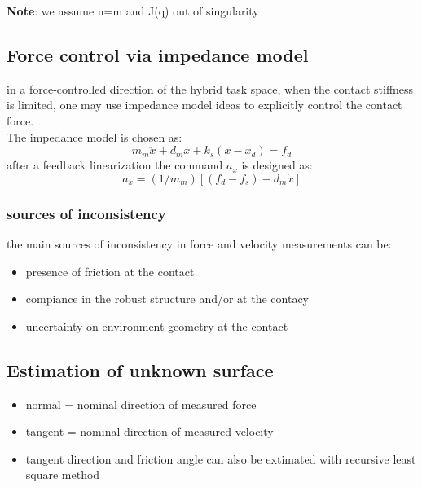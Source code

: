 \documentclass[a4paper,12pt]{article}
\begin{document}
\textbf{Note}: we assume n=m and J(q) out of singularity
\subsection{Force control via impedance model}
in a force-controlled direction of the hybrid task space, when the contact
stiffness is limited,
one may use impedance model ideas to 
explicitly control the contact force.\\
The impedance model is chosen as:\begin{equation}
m_m\ddot{x}+d_m\dot{x}+k_s(x-x_d)=f_d
\end{equation}
after a feedback linearization the command $a_x$ is designed as:
\begin{equation}
a_x =(1/m_m)[(f_d-f_s)-d_m\dot{x}]
\end{equation}
\subsubsection{sources of inconsistency}
the main sources of inconsistency in force and velocity measurements can be:
\begin{itemize}
    \item presence of friction at the contact 
    \item compiance in the robust structure and/or at the contacy
    \item uncertainty on environment geometry at the contact
\end{itemize}
\subsection{Estimation of unknown surface}
\begin{itemize}
    \item normal = nominal direction of measured force
    \item tangent = nominal direction of measured velocity
    \item  tangent direction and friction angle can also be extimated with 
    recursive least square method
\end{itemize}
\end{document}
